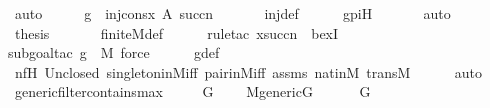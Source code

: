\begin{isabellebody}
\ auto\isanewline
\ \ \isamarkupfalse%
\ \isamarkupfalse%
\ {\isachardoublequoteopen}g\ {\isasymin}\ inj{\isacharparenleft}{\kern0pt}cons{\isacharparenleft}{\kern0pt}x{\isacharcomma}{\kern0pt}\ A{\isacharparenright}{\kern0pt}{\isacharcomma}{\kern0pt}\ succ{\isacharparenleft}{\kern0pt}n{\isacharparenright}{\kern0pt}{\isacharparenright}{\kern0pt}{\isachardoublequoteclose}\ \isanewline
\ \ \ \ \isamarkupfalse%
\ inj{\isacharunderscore}{\kern0pt}def\isanewline
\ \ \ \ \isamarkupfalse%
\ gpiH\ \isanewline
\ \ \ \ \isamarkupfalse%
\ auto\isanewline
\isanewline
\ \ \isamarkupfalse%
\ \isamarkupfalse%
\ {\isacharquery}{\kern0pt}thesis\ \isanewline
\ \ \ \ \isamarkupfalse%
\ finite{\isacharunderscore}{\kern0pt}M{\isacharunderscore}{\kern0pt}def\ \isanewline
\ \ \ \ \isamarkupfalse%
{\isacharparenleft}{\kern0pt}rule{\isacharunderscore}{\kern0pt}tac\ x{\isacharequal}{\kern0pt}{\isachardoublequoteopen}succ{\isacharparenleft}{\kern0pt}n{\isacharparenright}{\kern0pt}{\isachardoublequoteclose}\ \ bexI{\isacharparenright}{\kern0pt}\isanewline
\ \ \ \ \ \isamarkupfalse%
{\isacharparenleft}{\kern0pt}subgoal{\isacharunderscore}{\kern0pt}tac\ {\isachardoublequoteopen}g\ {\isasymin}\ M{\isachardoublequoteclose}{\isacharcomma}{\kern0pt}\ force{\isacharparenright}{\kern0pt}\isanewline
\ \ \ \ \isamarkupfalse%
\ g{\isacharunderscore}{\kern0pt}def\isanewline
\ \ \ \ \isamarkupfalse%
\ nfH\ Un{\isacharunderscore}{\kern0pt}closed\ singleton{\isacharunderscore}{\kern0pt}in{\isacharunderscore}{\kern0pt}M{\isacharunderscore}{\kern0pt}iff\ pair{\isacharunderscore}{\kern0pt}in{\isacharunderscore}{\kern0pt}M{\isacharunderscore}{\kern0pt}iff\ assms\ nat{\isacharunderscore}{\kern0pt}in{\isacharunderscore}{\kern0pt}M\ transM\isanewline
\ \ \ \ \isamarkupfalse%
\ auto\ \ \isanewline
{}\isamarkupfalse%
%
\endisatagproof
{\isafoldproof}%
%
\isadelimproof
\isanewline
%
\endisadelimproof
\isanewline
{}\isamarkupfalse%
\ generic{\isacharunderscore}{\kern0pt}filter{\isacharunderscore}{\kern0pt}contains{\isacharunderscore}{\kern0pt}max\ {\isacharcolon}{\kern0pt}\ \isanewline
\ \ \ G\ \isanewline
\ \ \ {\isachardoublequoteopen}M{\isacharunderscore}{\kern0pt}generic{\isacharparenleft}{\kern0pt}G{\isacharparenright}{\kern0pt}{\isachardoublequoteclose}\ \isanewline
\ \ \ {\isachardoublequoteopen}{}\ {\isasymin}\ G{\isachardoublequoteclose}\ \isanewline

\end{isabellebody}
